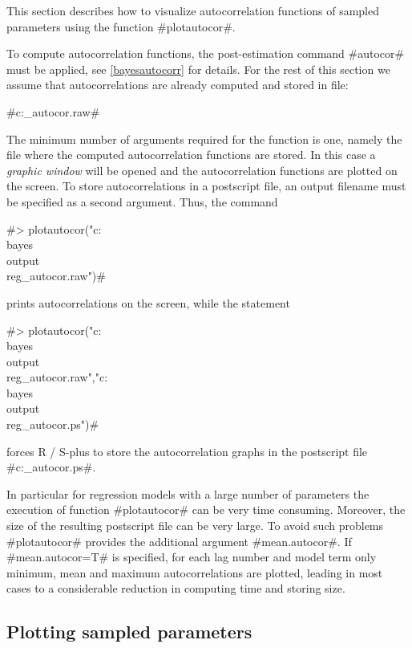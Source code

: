 This section describes how to visualize autocorrelation functions of
sampled parameters using the function #plotautocor#.

To compute autocorrelation functions, the post-estimation command
#autocor# must be applied, see \autoref{bayesautocorr} for
details. For the rest of this section we assume that
autocorrelations are already computed and stored in file:

#c:\bayes\output\reg_autocor.raw#

The minimum number of arguments required for the function is one,
namely the file where the computed autocorrelation functions are
stored. In this case a {\em graphic window} will be opened and the
autocorrelation functions are plotted on the screen. To store
autocorrelations in a postscript file, an output filename must be
specified as a second argument. Thus, the command

#> plotautocor("c:\\bayes\\output\\reg_autocor.raw")#

prints autocorrelations on the screen, while the statement

 #> plotautocor("c:\\bayes\\output\\reg_autocor.raw","c:\\bayes\\output\\reg_autocor.ps")#

forces R / S-plus to store the autocorrelation graphs in the
postscript file #c:\bayes\output\reg_autocor.ps#.

In particular for regression models with a large number of
parameters the execution of function #plotautocor# can be very time
consuming. Moreover, the size of the resulting postscript file can
be very large. To avoid such problems #plotautocor# provides the
additional argument #mean.autocor#. If #mean.autocor=T# is
specified, for each lag number and model term only minimum, mean and
maximum autocorrelations are plotted, leading in most cases to a
considerable reduction in computing time and storing size.

\subsection{Plotting sampled parameters} \label{splusplotsample}
 

